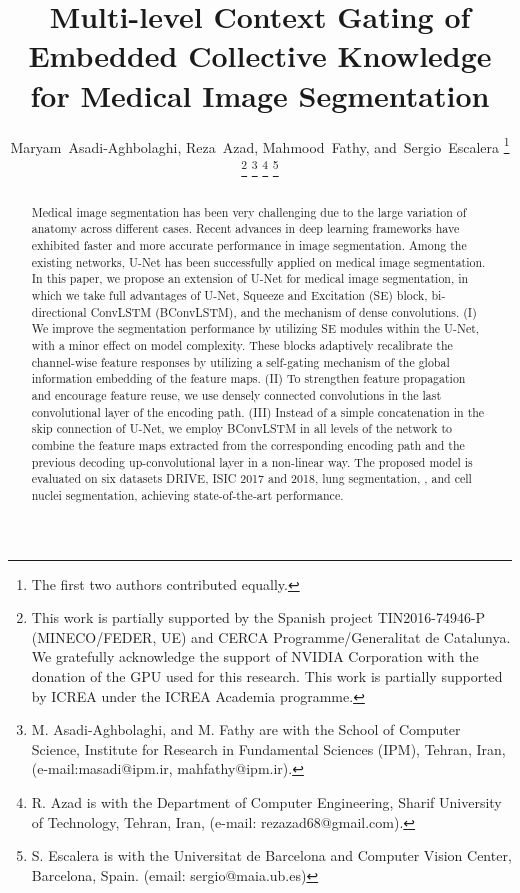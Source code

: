 \documentclass[journal]{IEEEtran}
\begin{document}
\title{Multi-level Context Gating of Embedded Collective Knowledge for Medical Image Segmentation}

\author{Maryam~Asadi-Aghbolaghi, Reza~Azad, Mahmood~Fathy, and~Sergio~Escalera
\thanks{The first two authors contributed equally.}
\thanks{This work is partially supported by the Spanish project TIN2016-74946-P (MINECO/FEDER, UE) and CERCA Programme/Generalitat de Catalunya. We gratefully acknowledge the support of NVIDIA Corporation with the donation of the GPU used for this research. This work is partially supported by ICREA under the ICREA Academia programme.}
\thanks{M. Asadi-Aghbolaghi, and M. Fathy are with the School of Computer Science, Institute for Research in Fundamental Sciences (IPM), Tehran, Iran, (e-mail:masadi@ipm.ir, mahfathy@ipm.ir).} 
\thanks{R. Azad is with the Department of Computer Engineering, Sharif University of Technology, Tehran, Iran, (e-mail: rezazad68@gmail.com).}
\thanks{S. Escalera is with the Universitat de Barcelona and Computer Vision Center, Barcelona, Spain. (email: sergio@maia.ub.es)}}

\maketitle

\begin{abstract}
Medical image segmentation has been very challenging due to the large variation of anatomy across different cases. Recent advances in deep learning frameworks have exhibited faster and more accurate performance in image segmentation. Among the existing networks, U-Net has been successfully applied on medical image segmentation.
In this paper, we propose an extension of U-Net for medical image segmentation, in which we take full advantages of U-Net, Squeeze and Excitation (SE) block, bi-directional ConvLSTM (BConvLSTM), and the mechanism of dense convolutions. 
(I) We improve the segmentation performance by utilizing SE modules within the U-Net, with a minor effect on model complexity. These blocks adaptively recalibrate the channel-wise feature responses by utilizing a self-gating mechanism of the global information embedding of the feature maps. 
(II) To strengthen feature propagation and encourage feature reuse, we use densely connected convolutions in the last convolutional layer of the encoding path. (III) Instead of a simple concatenation in the skip connection of U-Net, we employ BConvLSTM in all levels of the network to combine the feature maps extracted from the corresponding encoding path and the previous decoding up-convolutional layer in a non-linear way. 
The proposed model is evaluated on six datasets DRIVE, ISIC 2017 and 2018, lung segmentation, , and cell nuclei segmentation, achieving state-of-the-art performance.

\end{abstract}
\end{document}
